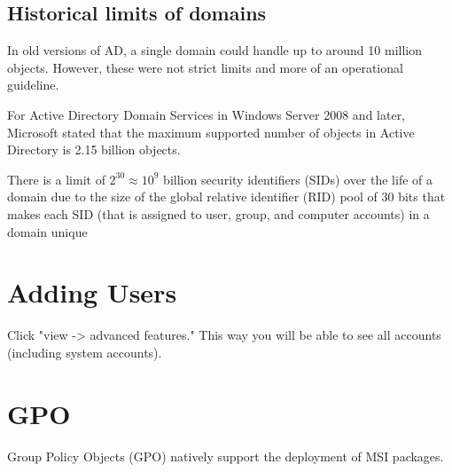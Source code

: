 \documentclass{article}
\begin{document}
\subsection{Historical limits of domains}
In old versions of AD, a single domain could handle up to around 
10 million objects. However, these were not strict limits 
and more of an operational guideline. 

For Active Directory Domain Services in Windows Server 2008 and later, 
Microsoft stated that the maximum supported number of objects 
in Active Directory is 2.15 billion objects. 

There is a limit of $2^{30} \approx 10^9$ billion security 
identifiers (SIDs) over the life of a domain 
due to the size of the global relative identifier (RID) 
pool of 30 bits that makes each SID 
(that is assigned to user, group, and computer accounts) in a domain unique

\section{Adding Users}
Click "view -> advanced features." This way you will be able to see all accounts (including system accounts).

\section{GPO}
Group Policy Objects (GPO) natively support the deployment of MSI packages.
\end{document}
